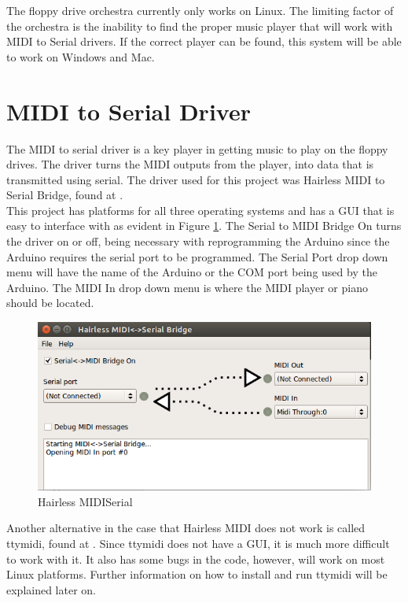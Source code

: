 \documentclass[11pt, a4paper]{report}
\begin{document}
The floppy drive orchestra currently only works on Linux. The limiting factor of the orchestra is the inability to find the proper music player that will work with MIDI to Serial drivers. If the correct player can be found, this system will be able to work on Windows and Mac.

\section{MIDI to Serial Driver}

The MIDI to serial driver is a key player in getting music to play on the floppy drives. The driver turns the MIDI outputs from the player, into data that is transmitted using serial. The driver used for this project was Hairless MIDI to Serial Bridge, found at \cite{HairlessMIDI}. \\

This project has platforms for all three operating systems and has a GUI that is easy to interface with as evident in Figure \ref{fig:hairless}. The Serial to MIDI Bridge On turns the driver on or off, being necessary with reprogramming the Arduino since the Arduino requires the serial port to be programmed. The Serial Port drop down menu will have the name of the Arduino or the COM port being used by the Arduino. The MIDI In drop down menu is where the MIDI player or piano should be located. \\

\begin{figure}[H]
\hspace*{-2cm}    
    \centering
    \includegraphics[width=.75\textwidth]{MIDISerial_Bridge.png}
    \caption{Hairless MIDISerial}
    \label{fig:hairless}
\end{figure} 

Another alternative in the case that Hairless MIDI does not work is called ttymidi, found at \cite{ttymidi}. Since ttymidi does not have a GUI, it is much more difficult to work with it. It also has some bugs in the code, however, will work on most Linux platforms. Further information on how to install and run ttymidi will be explained later on. 
\end{document}
